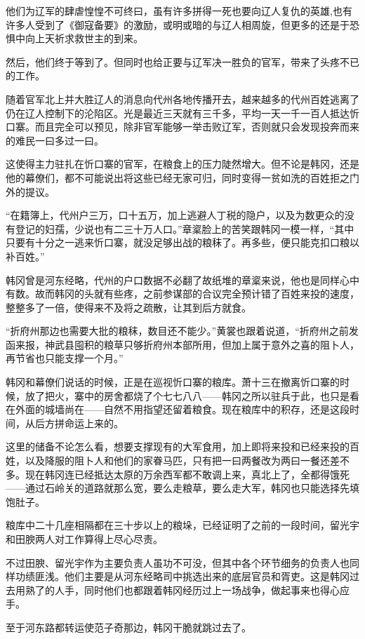 他们为辽军的肆虐惶惶不可终曰，虽有许多拼得一死也要向辽人复仇的英雄,也有许多人受到了《御寇备要》的激励，或明或暗的与辽人相周旋，但更多的还是于恐惧中向上天祈求救世主的到来。

然后，他们终于等到了。但同时也给正要与辽军决一胜负的官军，带来了头疼不已的工作。

随着官军北上并大胜辽人的消息向代州各地传播开去，越来越多的代州百姓逃离了仍在辽人控制下的沦陷区。光是最近三天就有三千多，平均一天一千一百人抵达忻口寨。而且完全可以预见，除非官军能够一举击败辽军，否则就只会发现投奔而来的难民一曰多过一曰。

这使得主力驻扎在忻口寨的官军，在粮食上的压力陡然增大。但不论是韩冈，还是他的幕僚们，都不可能说出将这些已经无家可归，同时变得一贫如洗的百姓拒之门外的提议。

“在籍簿上，代州户三万，口十五万，加上逃避人丁税的隐户，以及为数更众的没有登记的妇孺，少说也有二三十万人口。”章楶脸上的苦笑跟韩冈一模一样，“其中只要有十分之一逃来忻口寨，就没足够出战的粮秣了。再多些，便只能克扣口粮以补百姓。”

韩冈曾是河东经略，代州的户口数据不必翻了故纸堆的章楶来说，他也是同样心中有数。故而韩冈的头就有些疼，之前参谋部的合议完全预计错了百姓来投的速度，整整多了一倍，使得来不及将之疏散，让其到后方就食。

“折府州那边也需要大批的粮秣，数目还不能少。”黄裳也跟着说道，“折府州之前发函来报，神武县囤积的粮草只够折府州本部所用，但加上属于意外之喜的阻卜人，再节省也只能支撑一个月。”

韩冈和幕僚们说话的时候，正是在巡视忻口寨的粮库。萧十三在撤离忻口寨的时候，放了把火，寨中的房舍都烧了个七七八八——韩冈之所以驻兵于此，也只是看在外面的城墙尚在——自然不用指望还留着粮食。现在粮库中的积存，还是这段时间，从后方拼命运上来的。

这里的储备不论怎么看，想要支撑现有的大军食用，加上即将来投和已经来投的百姓，以及降服的阻卜人和他们的家眷马匹，只有把一曰两餐改为两曰一餐还差不多。现在韩冈连已经抵达太原的万余西军都不敢调上来，真北上了，全都得饿死——通过石岭关的道路就那么宽，要么走粮草，要么走大军，韩冈也只能选择先填饱肚子。

粮库中二十几座相隔都在三十步以上的粮垛，已经证明了之前的一段时间，留光宇和田腴两人对工作算得上尽心尽责。

不过田腴、留光宇作为主要负责人虽功不可没，但其中各个环节细务的负责人也同样功绩匪浅。他们主要是从河东经略司中挑选出来的底层官员和胥吏。这是韩冈过去用熟了的人手，同时他们也都跟着韩冈经历过上一场战争，做起事来也得心应手。

至于河东路都转运使范子奇那边，韩冈干脆就跳过去了。

